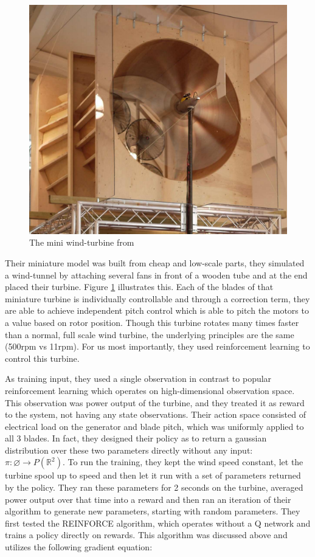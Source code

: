 \documentclass[hyperref,final,beleg]{cgvpub}
\begin{document}
\begin{figure}
  \centering
  \includegraphics[width=0.5\linewidth]{images/Miniturbine.png}
  \caption{The mini wind-turbine from \cite{kolterDesignAnalysisLearning2012}}
  \label{fig:miniturbine}
\end{figure}

Their miniature model was built from cheap and low-scale parts, they simulated a wind-tunnel by attaching several fans in front of a wooden tube and at the end placed their turbine. Figure \ref{fig:miniturbine} illustrates this. Each of the blades of that miniature turbine is individually controllable and through a correction term, they are able to achieve independent pitch control which is able to pitch the motors to a value based on rotor position. Though this turbine rotates many times faster than a normal, full scale wind turbine, the underlying principles are the same (500rpm vs 11rpm). For us most importantly, they used reinforcement learning to control this turbine.

As training input, they used a single observation in contrast to popular reinforcement learning which operates on high-dimensional observation space. This observation was power output of the turbine, and they treated it as reward to the system, not having any state observations. Their action space consisted of electrical load on the generator and blade pitch, which was uniformly applied to all 3 blades. In fact, they designed their policy as to return a gaussian distribution over these two parameters directly without any input: $\pi: \varnothing \rightarrow P(\mathbb{R}^2)$. To run the training, they kept the wind speed constant, let the turbine spool up to speed and then let it run with a set of parameters returned by the policy. They ran these parameters for 2 seconds on the turbine, averaged power output over that time into a reward and then ran an iteration of their algorithm to generate new parameters, starting with random parameters. 
They first tested the \ac{REINFORCE} algorithm, which operates without a Q network and trains a policy directly on rewards. This algorithm was discussed above and utilizes the following gradient equation:
\end{document}
